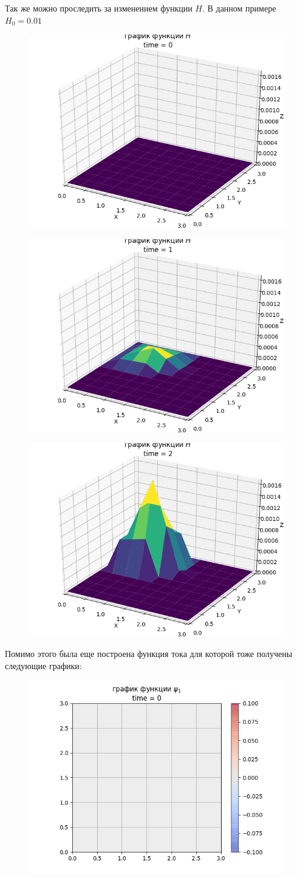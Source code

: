\documentclass[14pt]{extreport}
\begin{document}
Так же можно проследить за изменением функции $H$. В данном примере $H_0=0.01$

\begin{figure}[H]
\centerline{
\includegraphics[width=0.5\linewidth]{images/ex1/H/0}}
\caption{}
\label{img:ex1:H:0}
\end{figure}

\begin{figure}[H]
\centerline{
\includegraphics[width=0.5\linewidth]{images/ex1/H/1}}
\caption{}
\label{img:ex1:H:1}
\end{figure}

\begin{figure}[H]
\centerline{
\includegraphics[width=0.5\linewidth]{images/ex1/H/2}}
\caption{}
\label{img:ex1:H:2}
\end{figure}


Помимо этого была еще построена функция тока для которой тоже получены следующие графики:

\begin{figure}[H]
\centerline{
\includegraphics[width=0.5\linewidth]{images/ex1/psi/0}}
\caption{}
\label{img:ex1:psi:0}
\end{figure}
\end{document}
